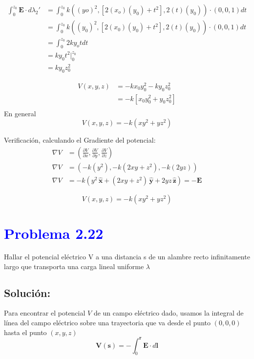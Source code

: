 \documentclass[12pt]{article}
\newcommand{\question}[1]{\textcolor{blue}{\textbf{#1}}}
\begin{document}
\begin{align*}
    \int_0^{z_0} \mathbf{E}\cdot d \lambda_2'& =  \int_0^{z_0} k((yo)^2,[2(x_o)(y_0) + t^2],2(t)(y_0)) \cdot (0,0,1)dt\\
    & = \int_0^{z_0} k((y_0)^2,[2(x_0)(y_0) + t^2],2(t)(y_0)) \cdot (0,0,1)dt\\
    & = \int_0^{z_0} 2ky_o t dt\\
    & = ky_0 t^2 \bigg|_0^{z_0} \\
    & = ky_0 z_0^2
\end{align*}

\begin{align*}
    V(x,y,z)& = -kx_0 y_0^2 - ky_0 z_0^2\\
& =-k[x_0y_0^2 + y_0z_0^2] \\
\end{align*}
En general 
\[\boxed{ V(x,y,z) = -k(xy^2 + yz^2)}\]


Verificación, calculando el Gradiente del potencial:
\begin{align*}
    \nabla V & = \left(\frac{\partial V}{\partial x}, \frac{\partial V}{\partial y}, \frac{\partial V}{\partial z}\right) \\
    \nabla V & = \left(-k(y^2), -k(2xy + z^2), -k(2yz)\right) \\
    \nabla V  & = -k\left(y^2\,\hat{\mathbf{x}} + (2xy + z^2)\,\hat{\mathbf{y}} + 2yz\,\hat{\mathbf{z}}\right) = -\mathbf{E}
\end{align*}

\[
    \boxed{V(x,y,z) = -k(xy^2 + yz^2)}
\]


\section*{\question{ Problema 2.22}} Hallar el potencial eléctrico V a una distancia s de un alambre recto infinitamente largo que transporta una carga lineal uniforme \(\lambda\)

\subsection*{Solución:}
Para encontrar el potencial \(V\) de un campo eléctrico dado,  usamos la integral de línea del campo eléctrico sobre una trayectoria que va desde el punto \((0,0,0)\) hasta el punto \((x,y,z)\)
\[
\mathbf{V(s)} = -\int_{0}^{\mathbf{r}} \mathbf{E}\cdot d \mathbf{l}   
\]    
\end{document}

